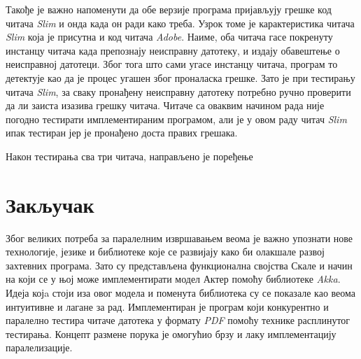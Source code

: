 \documentclass[12pt,oneside]{memoir}
\begin{document}
Такође је важно напоменути да обе верзије програма пријављују грешке код читача \textit{Slim} и онда када он ради како треба. Узрок томе је карактеристика читача \textit{Slim} која је присутна и код читача \textit{Adobe}. Наиме, оба читача гасе покренуту инстанцу читача када препознају неисправну датотеку, и издају обавештење о неисправној датотеци. Због тога што сами угасе инстанцу читача, програм то детектује као да је процес угашен због проналаска грешке. Зато је при тестирању читача \textit{Slim}, за сваку пронађену неисправну датотеку потребно ручно проверити да ли заиста изазива грешку читача. Читаче са оваквим начином рада није погодно тестирати имплементираним програмом, али је у овом раду читач \textit{Slim} ипак тестиран јер је пронађено доста правих грешака. 


Након тестирања сва три читача, направљено је поређење 



%



\chapter{Закључак}
\label{chp:zakljucak}


Због великих потреба за паралелним извршавањем веома је важно упознати нове технологије, језике и библиотеке које се развијају како би олакшале развој захтевних програма. Зато су представљена функционална својства Скале и начин на који се у њој може имплементирати модел Актер помоћу библиотеке \textit{Akka}. Идеја којa стоји иза овог модела и поменута библиотека су се показале као веома интуитивне и лагане за рад. Имплементиран је програм који конкурентно и паралелно тестира читаче датотека у формату \textit{PDF} помоћу технике расплинутог тестирања. Концепт размене порука је омогућио брзу и лаку имплементацију паралелизације. 
\end{document}
